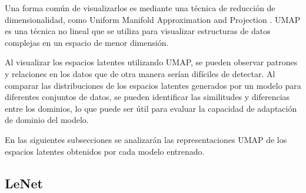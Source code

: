 Una forma común de visualizarlos es mediante una técnica de reducción de dimensionalidad, como Uniform Manifold
Approximation and Projection \parencite{mcinnes2018umap}. UMAP es una técnica no lineal que se utiliza para visualizar estructuras de datos complejas en
un espacio de menor dimensión.

Al visualizar los espacios latentes utilizando UMAP, se pueden observar patrones y relaciones en los datos que de otra
manera serían difíciles de detectar. Al comparar las distribuciones de los espacios latentes generados por un modelo
para diferentes conjuntos de datos, se pueden identificar las similitudes y diferencias entre los dominios, lo que
puede ser útil para evaluar la capacidad de adaptación de dominio del modelo.

En las siguientes subsecciones se analizarán las representaciones UMAP de los espacios latentes obtenidos por cada
modelo entrenado.

\subsection{LeNet}

